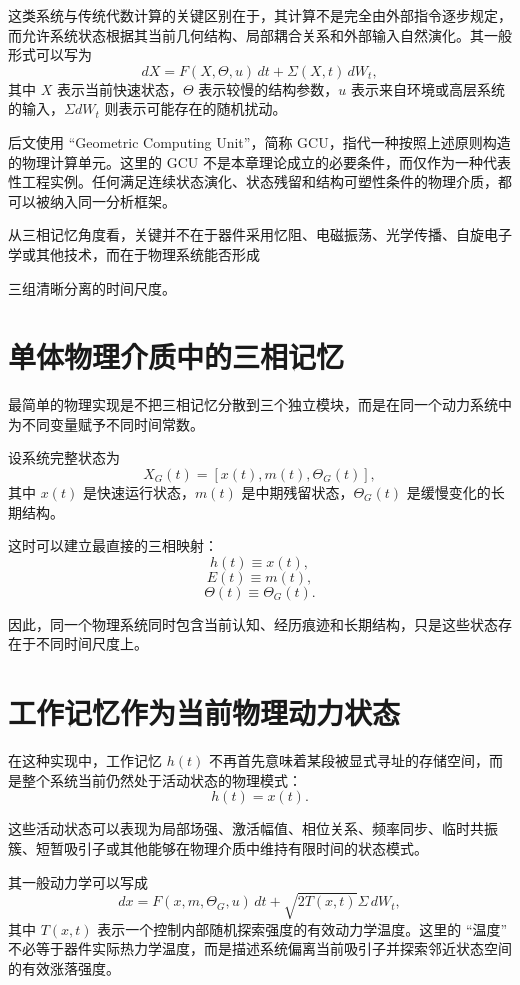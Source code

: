 这类系统与传统代数计算的关键区别在于，其计算不是完全由外部指令逐步规定，而允许系统状态根据其当前几何结构、局部耦合关系和外部输入自然演化。其一般形式可以写为
\[
dX
=
F(X,\Theta,u)\,dt
+
\Sigma(X,t)\,dW_t,
\]
其中 $X$ 表示当前快速状态，$\Theta$ 表示较慢的结构参数，$u$ 表示来自环境或高层系统的输入，$\Sigma dW_t$ 则表示可能存在的随机扰动。

后文使用 ``Geometric Computing Unit''，简称 GCU，指代一种按照上述原则构造的物理计算单元。这里的 GCU 不是本章理论成立的必要条件，而仅作为一种代表性工程实例。任何满足连续状态演化、状态残留和结构可塑性条件的物理介质，都可以被纳入同一分析框架。

从三相记忆角度看，关键并不在于器件采用忆阻、电磁振荡、光学传播、自旋电子学或其他技术，而在于物理系统能否形成
\begin{statementbox}
\centering
{}
\end{statementbox}
三组清晰分离的时间尺度。

\section{单体物理介质中的三相记忆}

最简单的物理实现是不把三相记忆分散到三个独立模块，而是在同一个动力系统中为不同变量赋予不同时间常数。

设系统完整状态为
\[
X_G(t)
=
[
x(t),
m(t),
\Theta_G(t)
],
\]
其中 $x(t)$ 是快速运行状态，$m(t)$ 是中期残留状态，$\Theta_G(t)$ 是缓慢变化的长期结构。

这时可以建立最直接的三相映射：
\[
h(t)\equiv x(t),
\]
\[
E(t)\equiv m(t),
\]
\[
\Theta(t)\equiv \Theta_G(t).
\]

因此，同一个物理系统同时包含当前认知、经历痕迹和长期结构，只是这些状态存在于不同时间尺度上。

\section{工作记忆作为当前物理动力状态}

在这种实现中，工作记忆 $h(t)$ 不再首先意味着某段被显式寻址的存储空间，而是整个系统当前仍然处于活动状态的物理模式：
\[
\boxed{
h(t)=x(t).
}
\]

这些活动状态可以表现为局部场强、激活幅值、相位关系、频率同步、临时共振簇、短暂吸引子或其他能够在物理介质中维持有限时间的状态模式。

其一般动力学可以写成
\[
dx
=
F(x,m,\Theta_G,u)\,dt
+
\sqrt{2T(x,t)}\Sigma\,dW_t,
\]
其中 $T(x,t)$ 表示一个控制内部随机探索强度的有效动力学温度。这里的 ``温度'' 不必等于器件实际热力学温度，而是描述系统偏离当前吸引子并探索邻近状态空间的有效涨落强度。

